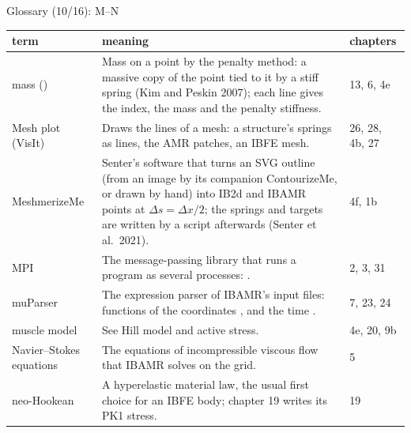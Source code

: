 \documentclass[aspectratio=169,11pt]{beamer}
\makeatletter
\newenvironment{glossarytable}{\scriptsize\renewcommand{\arraystretch}{1.08}%
  \begin{tabular}{@{}L{0.19\textwidth}L{0.63\textwidth}L{0.12\textwidth}@{}}\toprule
  term & meaning & chapters\\\midrule}{\bottomrule\end{tabular}}
\makeatother
\begin{document}
\begin{frame}{Glossary (10/16): M--N}
\label{fr:g10}
\begin{glossarytable}
mass () & Mass on a point by the penalty method: a massive copy of the point tied to it by a stiff spring (Kim and Peskin 2007); each line gives the index, the mass and the penalty stiffness. & 13, 6, 4e\\
Mesh plot (VisIt) & Draws the lines of a mesh: a structure's springs as lines, the AMR patches, an IBFE mesh. & 26, 28, 4b, 27\\
MeshmerizeMe & Senter's software that turns an SVG outline (from an image by its companion ContourizeMe, or drawn by hand) into IB2d and IBAMR  points at $\Delta s = \Delta x/2$; the springs and targets are written by a script afterwards (Senter et al.\ 2021). & 4f, 1b\\
MPI & The message-passing library that runs a program as several processes: . & 2, 3, 31\\
muParser & The expression parser of IBAMR's input files: functions of the coordinates ,  and the time . & 7, 23, 24\\
muscle model & See Hill model and active stress. & 4e, 20, 9b\\
Navier--Stokes equations & The equations of incompressible viscous flow that IBAMR solves on the grid. & 5\\
neo-Hookean & A hyperelastic material law, the usual first choice for an IBFE body; chapter 19 writes its PK1 stress. & 19\\
\end{glossarytable}
\end{frame}
\end{document}
